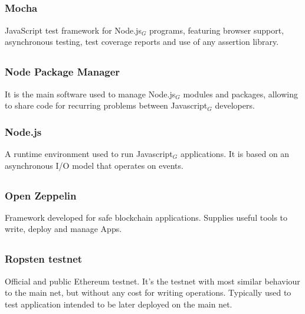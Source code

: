	\subsection*{}
		\subsubsection*{Mocha}
			JavaScript test framework for Node.js$_{G}$ programs, featuring browser support, asynchronous testing, test coverage reports and use of any assertion library.
	
	\subsection*{}
		\subsubsection*{Node Package Manager}
			It is the main software used to manage Node.js$_{G}$ modules and packages, allowing to share code for recurring problems between Javascript$_{G}$ developers.
		\subsubsection*{Node.js}
			A runtime environment used to run Javascript$_{G}$ applications. It is based on an asynchronous I/O model that operates on events.
	
	\subsection*{}
		\subsubsection*{Open Zeppelin}
			Framework developed for safe blockchain applications. Supplies useful tools to write, deploy and manage \DJ{}Apps.
      
	\subsection*{}
		\subsubsection*{Ropsten testnet}
			Official and public Ethereum testnet. It's the testnet with most similar behaviour to the main net, but without any cost for writing operations. Typically used to test application intended to be later deployed on the main net.
      
